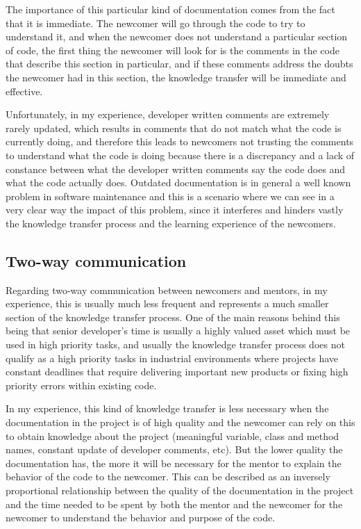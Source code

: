 \documentclass[12pt, letterpaper]{article}
\begin{document}
The importance of this particular kind of documentation comes from the fact that it is immediate.
The newcomer will go through the code to try to understand it, and when the newcomer does not understand 
a particular section of code, the first thing the newcomer will look for is the comments in the code
that describe this section in particular, and if these comments address the doubts the newcomer had in this 
section, the knowledge transfer will be immediate and effective.

Unfortunately, in my experience, developer written comments are extremely rarely updated, which results in 
comments that do not match what the code is currently doing, and therefore this leads to newcomers not 
trusting the comments to understand what the code is doing because there is a discrepancy and a lack of 
constance between what the developer written comments say the code does and what the code actually does. 
Outdated documentation is in general a well known problem in software maintenance and this is a scenario
where we can see in a very clear way the impact of this problem, since it interferes and hinders vastly the 
knowledge transfer process and the learning experience of the newcomers.

\subsection{Two-way communication}
Regarding two-way communication between newcomers and mentors, in my experience, this is usually much less frequent and
represents a much smaller section of the knowledge transfer process. One of the main reasons behind this being that
senior developer's time is usually a highly valued asset which must be used in high priority tasks, and usually
the knowledge transfer process does not qualify as a high priority tasks in industrial environments where
projects have constant deadlines that require delivering important new products or fixing high priority errors
within existing code. 

In my experience, this kind of knowledge transfer is less necessary when the documentation in the project is of high
quality and the newcomer can rely on this to obtain knowledge about the project (meaningful variable, class and 
method names, constant update of developer comments, etc). But the lower quality the documentation has, the more
it will be necessary for the mentor to explain the behavior of the code to the newcomer. This can be described
as an inversely proportional relationship between the quality of the documentation in the project and the 
time needed to be spent by both the mentor and the newcomer for the newcomer to understand the behavior and
purpose of the code. 
\end{document}
